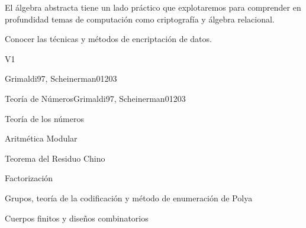 \begin{syllabus}


\begin{justification}
El álgebra abstracta tiene un lado práctico que explotaremos para
comprender en profundidad temas de computación como criptografía y
álgebra relacional.
\end{justification}

\begin{goals}
\item Conocer las técnicas y métodos de encriptación de datos.
\end{goals}

\begin{outcomes}{V1}
\end{outcomes}

\begin{unit}{\ALCryptographicAlgorithmsDef}{}{Grimaldi97, Scheinerman01}{20}{3}
    \ALCryptographicAlgorithmsAllTopics
    \ALCryptographicAlgorithmsAllObjectives
\end{unit}



\begin{unit}{Teoría de Números}{}{Grimaldi97, Scheinerman01}{20}{3}
   \begin{topics}
      \item Teoría de los números
      \item Aritmética  Modular
      \item Teorema del Residuo Chino
      \item Factorización
      \item Grupos, teoría de la codificación y método de enumeración de Polya
      \item Cuerpos finitos y diseños combinatorios
   \end{topics}


\end{unit}
\end{syllabus}
